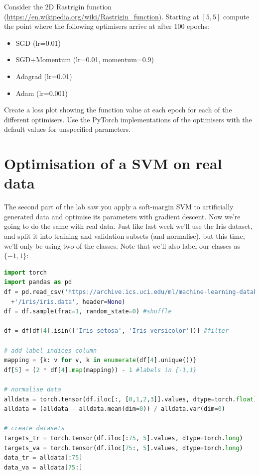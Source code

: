 \documentclass[a4paper]{article}
\begin{document}
\begin{tcolorbox}[title=1.1 Rastrigin (3 marks)]
Consider the 2D Rastrigin function (\url{https://en.wikipedia.org/wiki/Rastrigin_function}). Starting at $[5, 5]$ compute the point where the following optimisers arrive at after 100 epochs:

\begin{itemize}
	\item SGD (lr=0.01)
	\item SGD+Momentum (lr=0.01, momentum=0.9)
	\item Adagrad (lr=0.01)
	\item Adam (lr=0.001)
\end{itemize}

Create a loss plot showing the function value at each epoch for each of the different optimisers. Use the PyTorch implementations of the optimisers with the default values for unspecified parameters.
\end{tcolorbox}

\section{Optimisation of a SVM on real data}\label{SVM}
The second part of the lab saw you apply a soft-margin SVM to artificially generated data and optimise its parameters with gradient descent. Now we're going to do the same with real data. Just like last week we'll use the Iris dataset, and split it into training and validation subsets (and normalise), but this time, we'll only be using two of the classes. Note that we'll also label our classes as $\{-1,1\}$:

\begin{lstlisting}[language=Python]
import torch
import pandas as pd
df = pd.read_csv('https://archive.ics.uci.edu/ml/machine-learning-databases'
  +'/iris/iris.data', header=None)
df = df.sample(frac=1, random_state=0) #shuffle

df = df[df[4].isin(['Iris-setosa', 'Iris-versicolor'])] #filter

# add label indices column
mapping = {k: v for v, k in enumerate(df[4].unique())}  
df[5] = (2 * df[4].map(mapping)) - 1 #labels in {-1,1}

# normalise data
alldata = torch.tensor(df.iloc[:, [0,1,2,3]].values, dtype=torch.float)
alldata = (alldata - alldata.mean(dim=0)) / alldata.var(dim=0)

# create datasets
targets_tr = torch.tensor(df.iloc[:75, 5].values, dtype=torch.long)
targets_va = torch.tensor(df.iloc[75:, 5].values, dtype=torch.long)
data_tr = alldata[:75]
data_va = alldata[75:]
\end{lstlisting}
\end{document}
